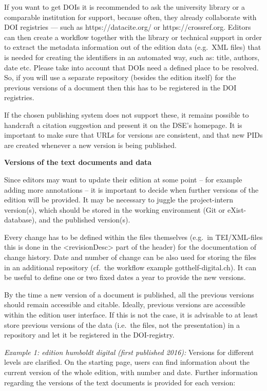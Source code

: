 \documentclass[
  letterpaper,
  DIV=11,
  numbers=noendperiod]{scrreprt}
\begin{document}
If you want to get DOIs it is recommended to ask the university library
or a comparable institution for support, because often, they already
collaborate with DOI registries --- such as https://datacite.org/ or
https://crossref.org. Editors can then create a workflow together with
the library or technical support in order to extract the metadata
information out of the edition data (e.g.~XML files) that is needed for
creating the identifiers in an automated way, such as: title, authors,
date etc. Please take into account that DOIs need a defined place to be
resolved. So, if you will use a separate repository (besides the edition
itself) for the previous versions of a document then this has to be
registered in the DOI registries.

If the chosen publishing system does not support these, it remains
possible to handcraft a citation suggestion and present it on the DSE's
homepage. It is important to make sure that URLs for versions are
consistent, and that new PIDs are created whenever a new version is
being published.

\textbf{Versions of the text documents and data}

Since editors may want to update their edition at some point -- for
example adding more annotations -- it is important to decide when
further versions of the edition will be provided. It may be necessary to
juggle the project-intern version(s), which should be stored in the
working environment (Git or eXist-database), and the published
version(s).

Every change has to be defined within the files themselves (e.g.~in
TEI/XML-files this is done in the \textless revisionDesc\textgreater{}
part of the header) for the documentation of change history. Date and
number of change can be also used for storing the files in an additional
repository (cf.~the workflow example gotthelf-digital.ch). It can be
useful to define one or two fixed dates a year to provide the new
versions.

By the time a new version of a document is published, all the previous
versions should remain accessible and citable. Ideally, previous
versions are accessible within the edition user interface. If this is
not the case, it is advisable to at least store previous versions of the
data (i.e.~the files, not the presentation) in a repository and let it
be registered in the DOI-registry.

\emph{Example 1: edition humboldt digital} \emph{(first published
2016):} Versions for different levels are clarified. On the starting
page, users can find information about the current version of the whole
edition, with number and date. Further information regarding the
versions of the text documents is provided for each version:
\end{document}
